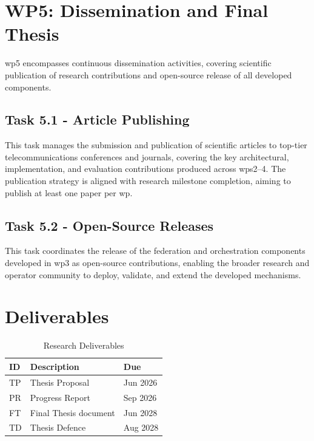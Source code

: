 \section{WP5: Dissemination and Final Thesis}

\ac{wp}5 encompasses continuous dissemination activities, covering scientific publication of research contributions and open-source release of all developed components.

\subsection{Task 5.1 - Article Publishing}

This task manages the submission and publication of scientific articles to top-tier telecommunications conferences and journals, covering the key architectural, implementation, and evaluation contributions produced across \acp{wp}2--4. The publication strategy is aligned with research milestone completion, aiming to publish at least one paper per \ac{wp}.

\subsection{Task 5.2 - Open-Source Releases}

This task coordinates the release of the federation and orchestration components developed in \ac{wp}3 as open-source contributions, enabling the broader research and operator community to deploy, validate, and extend the developed mechanisms.


\section{Deliverables}

\begin{table}[h!]
\centering
\caption{Research Deliverables}
\label{tab:deliverables}
\renewcommand{\arraystretch}{1.3}
\begin{tabular}{@{}lp{8.5cm}l@{}}
\hline
\textbf{ID} & \textbf{Description} & \textbf{Due} \\
\hline
TP & Thesis Proposal                & Jun 2026 \\
PR & Progress Report                & Sep 2026 \\
FT & Final Thesis document          & Jun 2028 \\
TD & Thesis Defence                 & Aug 2028 \\
\hline
\end{tabular}
\end{table}


